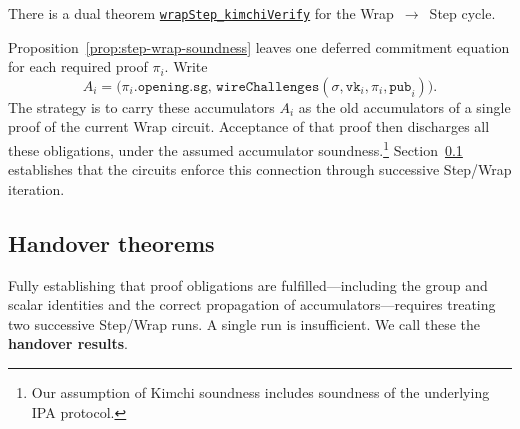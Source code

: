 \documentclass[11pt,a4paper]{article}
\newcommand{\inlinecode}[1]{\mbox{\texttt{#1}}}
\theoremstyle{definition}
\theoremstyle{insetstatement}
\begin{document}
There is a dual theorem
\href{https://github.com/l-adic/snarky/blob/main/formal/pickles/Pickles/Soundness/WrapStep.lean\#L471}{\inlinecode{wrapStep\_kimchiVerify}}
for the Wrap~$\to$~Step cycle.


Proposition~\ref{prop:step-wrap-soundness} leaves one deferred commitment
equation for each required proof $\pi_i$. Write
\[
  A_i = \bigl(\pi_i.\mathtt{opening.sg},\,
    \mathtt{wireChallenges}(\sigma,\mathtt{vk}_i,\pi_i,\mathtt{pub}_i)\bigr).
\]
The strategy is to carry these accumulators $A_i$ as the old accumulators
of a single proof of the current Wrap circuit. Acceptance of that proof
then discharges all these obligations, under the assumed accumulator
soundness.\footnote{Our assumption of Kimchi soundness includes soundness
  of the underlying IPA protocol.}
Section~\ref{sec:handover} establishes that the circuits enforce this
connection through successive Step/Wrap iteration.

\subsection{Handover theorems}
\label{sec:handover}

Fully establishing that proof obligations are fulfilled---including the
group and scalar identities and the correct propagation of
accumulators---requires treating two successive Step/Wrap runs. A single
run is insufficient. We call these the \textbf{handover results}.
\end{document}
